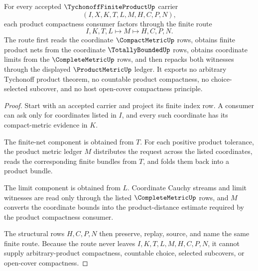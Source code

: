 \begin{theorem}
\label{thm:tychonoff-finite-product-net-product-route}
For every accepted $\TychonoffFiniteProductUp$ carrier
$$
(I,X,K,T,L,M,H,C,P,N),
$$
each product compactness consumer factors through the finite route
$$
I,K,T,L \longmapsto M \longmapsto H,C,P,N .
$$
The route first reads the coordinate $\CompactMetricUp$ rows, obtains finite product nets from the coordinate $\TotallyBoundedUp$ rows, obtains coordinate limits from the $\CompleteMetricUp$ rows, and then repacks both witnesses through the displayed $\ProductMetricUp$ ledger. It exports no arbitrary Tychonoff product theorem, no countable product compactness, no choice-selected subcover, and no host open-cover compactness principle.
\end{theorem}
\begin{proof}
Start with an accepted carrier and project its finite index row. A consumer can ask only for coordinates listed in $I$, and every such coordinate has its compact-metric evidence in $K$.

The finite-net component is obtained from $T$. For each positive product tolerance, the product metric ledger $M$ distributes the request across the listed coordinates, reads the corresponding finite bundles from $T$, and folds them back into a product bundle.

The limit component is obtained from $L$. Coordinate Cauchy streams and limit witnesses are read only through the listed $\CompleteMetricUp$ rows, and $M$ converts the coordinate bounds into the product-distance estimate required by the product compactness consumer.

The structural rows $H,C,P,N$ then preserve, replay, source, and name the same finite route. Because the route never leaves $I,K,T,L,M,H,C,P,N$, it cannot supply arbitrary-product compactness, countable choice, selected subcovers, or open-cover compactness.
\end{proof}


